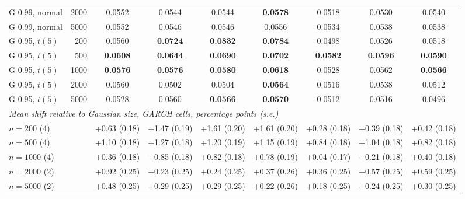 \begin{tabular}{lrccccccc}
G 0.99, normal & 2000 & 0.0552 & 0.0544 & 0.0544 & \textbf{0.0578} & 0.0518 & 0.0530 & 0.0540 \\
G 0.99, normal & 5000 & 0.0552 & 0.0546 & 0.0546 & 0.0556 & 0.0534 & 0.0538 & 0.0538 \\
G 0.95, $t(5)$ & 200 & 0.0560 & \textbf{0.0724} & \textbf{0.0832} & \textbf{0.0784} & 0.0498 & 0.0526 & 0.0518 \\
G 0.95, $t(5)$ & 500 & \textbf{0.0608} & \textbf{0.0644} & \textbf{0.0690} & \textbf{0.0702} & \textbf{0.0582} & \textbf{0.0596} & \textbf{0.0590} \\
G 0.95, $t(5)$ & 1000 & \textbf{0.0576} & \textbf{0.0576} & \textbf{0.0580} & \textbf{0.0618} & 0.0528 & 0.0562 & \textbf{0.0566} \\
G 0.95, $t(5)$ & 2000 & 0.0560 & 0.0502 & 0.0504 & \textbf{0.0564} & 0.0516 & 0.0538 & 0.0512 \\
G 0.95, $t(5)$ & 5000 & 0.0528 & 0.0560 & \textbf{0.0566} & \textbf{0.0570} & 0.0512 & 0.0516 & 0.0496 \\
\midrule
\multicolumn{9}{l}{\emph{Mean shift relative to Gaussian size, GARCH cells, percentage points (s.e.)}}\\
\multicolumn{2}{l}{$n = 200$ (4)} & +0.63 (0.18) & +1.47 (0.19) & +1.61 (0.20) & +1.61 (0.20) & +0.28 (0.18) & +0.39 (0.18) & +0.42 (0.18) \\
\multicolumn{2}{l}{$n = 500$ (4)} & +1.10 (0.18) & +1.27 (0.18) & +1.20 (0.19) & +1.15 (0.19) & +0.84 (0.18) & +1.04 (0.18) & +0.82 (0.18) \\
\multicolumn{2}{l}{$n = 1000$ (4)} & +0.36 (0.18) & +0.85 (0.18) & +0.82 (0.18) & +0.78 (0.19) & +0.04 (0.17) & +0.21 (0.18) & +0.40 (0.18) \\
\multicolumn{2}{l}{$n = 2000$ (2)} & +0.92 (0.25) & +0.23 (0.25) & +0.24 (0.25) & +0.37 (0.26) & +0.36 (0.25) & +0.57 (0.25) & +0.59 (0.25) \\
\multicolumn{2}{l}{$n = 5000$ (2)} & +0.48 (0.25) & +0.29 (0.25) & +0.29 (0.25) & +0.22 (0.26) & +0.18 (0.25) & +0.24 (0.25) & +0.30 (0.25) \\
\bottomrule
\end{tabular}
